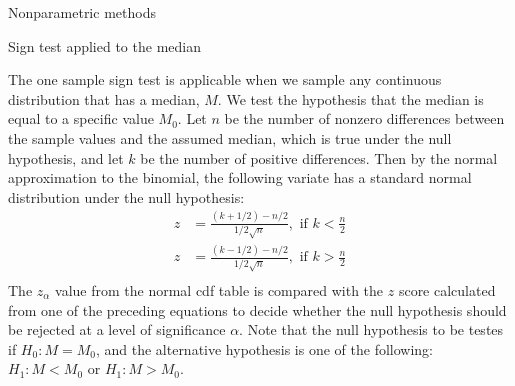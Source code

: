 \documentclass[8pt]{beamer}
\renewcommand{\emph}[1]{\textcolor{myorange}{#1}}
\begin{document}
\begin{frame}{Nonparametric methods}

    \begin{block}{Sign test applied to the median}
    \end{block}
    The \alert{one sample sign test} is applicable when we sample any continuous distribution that has a \emph{median, $M$}. We test the hypothesis that the \emph{median} is equal to a specific value $M_0$. Let $n$ be the number of nonzero differences between the sample values and the assumed median, which is true under the null hypothesis, and let $k$ be the number of positive differences. Then by the \emph{normal approximation} to the \emph{binomial}, the following variate has a \emph{standard normal distribution} under the null hypothesis:
    \begin{align*}
        z &= \frac{(k + 1/2)-n/2}{1/2 \sqrt{n}}, \text{ if } k < \frac{n}{2} \\
        z &= \frac{(k - 1/2)-n/2}{1/2 \sqrt{n}}, \text{ if } k > \frac{n}{2} \\
    \end{align*}
    The $z_{\alpha}$ value from the \emph{normal cdf} table is compared with the $z$ score calculated from one of the preceding equations to decide whether the \emph{null hypothesis} should be rejected at a level of significance $\alpha$. Note that the null hypothesis to be testes if $H_0 : M = M_0$, and the alternative hypothesis is one of the following: $H_1 : M < M_0$ or $H_1 : M > M_0$. 
    \end{frame}
\end{document}
